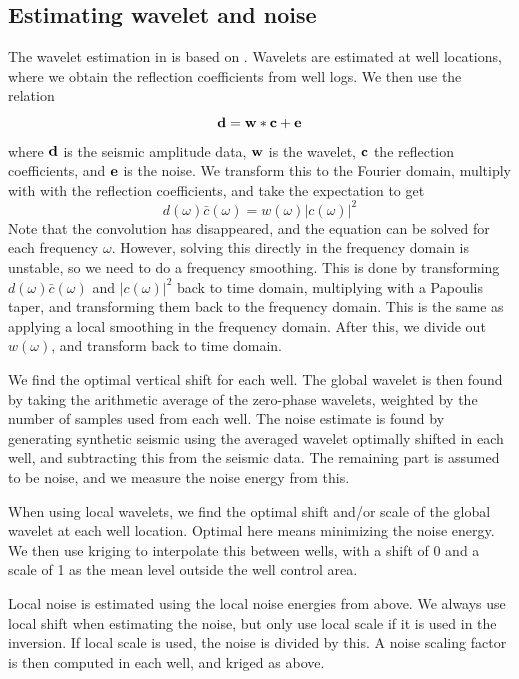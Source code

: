 \subsection{Estimating wavelet and noise}
\label{sec:waveestimp}
The wavelet estimation in \crava is based on \cite{White84}. Wavelets are estimated at well locations, where we obtain the reflection coefficients from well logs. We then use the relation
\begin{equation}
\mathbf{d} = \mathbf{w}*\mathbf{c}+\mathbf{e}
\end{equation}
where $\mathbf{d}$ is the seismic amplitude data, $\mathbf{w}$ is the wavelet, $\mathbf{c}$ the reflection coefficients, and $\mathbf{e}$ is the noise. We transform this to the Fourier domain, multiply with with the reflection coefficients, and take the expectation to get
\begin{equation}
d(\omega)\bar{c}(\omega) = w(\omega)|c(\omega)|^2
\end{equation}
Note that the convolution has disappeared, and the equation can be solved for each frequency $\omega$. However, solving this directly in the frequency domain is unstable, so we need to do a frequency smoothing. This is done by transforming $d(\omega)\bar{c}(\omega)$ and $|c(\omega)|^2$ back to time domain, multiplying with a Papoulis taper, and transforming them back to the frequency domain. This is the same as applying a local smoothing in the frequency domain. After this, we divide out $w(\omega)$, and transform back to time domain.

We find the optimal vertical shift for each well. The global wavelet is then found by taking the arithmetic average of the zero-phase wavelets, weighted by the number of samples used from each well. The noise estimate is found by generating synthetic seismic using the averaged wavelet optimally shifted in each well, and subtracting this from the seismic data. The remaining part is assumed to be noise, and we measure the noise energy from this.

When using local wavelets, we find the optimal shift and/or scale of the global wavelet at each well location. Optimal here means minimizing the noise energy. We then use kriging to interpolate this between wells, with a shift of 0 and a scale of 1 as the mean level outside the well control area.

Local noise is estimated using the local noise energies from above. We always use local shift when estimating the noise, but only use local scale if it is used in the inversion. If local scale is used, the noise is divided by this. A noise scaling factor is then computed in each well, and kriged as above.

